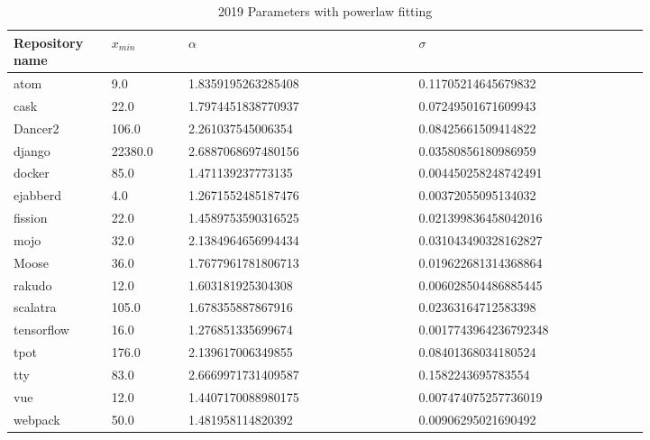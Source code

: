 \documentclass[conference]{IEEEtran}
\begin{document}
\begin{table}[htbp]
	\caption{2019 Parameters with powerlaw fitting}
	\begin{center}
		\begin{tabular}{| p{0.12\linewidth} | p{0.1\linewidth} | p{0.3\linewidth} | p{0.3\linewidth} |}
	\hline
	Repository name &$x_{min}$ & $\alpha$ & $\sigma$\\
	\hline
atom  &9.0  &1.8359195263285408  &0.11705214645679832 \\
cask  &22.0   &1.7974451838770937  &0.07249501671609943 \\
Dancer2  &106.0   &2.261037545006354  &0.08425661509414822 \\
django  &22380.0   &2.6887068697480156  &0.03580856180986959\\
docker  &85.0  &1.471139237773135  &0.004450258248742491 \\
ejabberd  &4.0   &1.2671552485187476  &0.00372055095134032 \\
fission  &22.0   &1.4589753590316525  &0.021399836458042016\\ 
mojo  &32.0   &2.1384964656994434  &0.031043490328162827 \\
Moose  &36.0   &1.7677961781806713  &0.019622681314368864 \\
rakudo  &12.0   &1.603181925304308  &0.006028504486885445 \\
scalatra  &105.0  &1.678355887867916  &0.02363164712583398 \\
tensorflow  &16.0  & 1.276851335699674  & 0.0017743964236792348 \\
tpot  &176.0   &2.139617006349855  &0.08401368034180524 \\
tty  &83.0   &2.6669971731409587  &0.1582243695783554 \\
vue  &12.0   &1.4407170088980175  &0.007474075257736019 \\
webpack &50.0  &1.481958114820392  &0.00906295021690492 \\
			\hline
		\end{tabular}
	\end{center}
\label{tab:2019pars}
\end{table}
\end{document}
